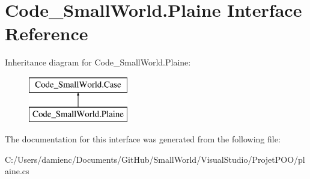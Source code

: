 \hypertarget{interface_code___small_world_1_1_plaine}{\section{Code\-\_\-\-Small\-World.\-Plaine Interface Reference}
\label{interface_code___small_world_1_1_plaine}
}
Inheritance diagram for Code\-\_\-\-Small\-World.\-Plaine\-:\begin{figure}[H]
\begin{center}
\leavevmode
\includegraphics[height=2.000000cm]{interface_code___small_world_1_1_plaine}
\end{center}
\end{figure}


The documentation for this interface was generated from the following file\-:\begin{DoxyCompactItemize}
\item 
C\-:/\-Users/damienc/\-Documents/\-Git\-Hub/\-Small\-World/\-Visual\-Studio/\-Projet\-P\-O\-O/plaine.\-cs\end{DoxyCompactItemize}
